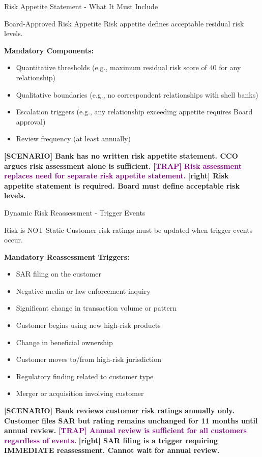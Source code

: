 \documentclass[11pt,a4paper]{beamer}
\newcommand{\trap}[1]{\textcolor{purple}{\textbf{[TRAP] #1}}}
\newcommand{\correct}[1]{\textcolor{green!50!black}{\textbf{[right] #1}}}
\newcommand{\scenario}[1]{\textcolor{blue!70!black}{\textbf{[SCENARIO] #1}}}
\begin{document}
\begin{frame}{Risk Appetite Statement - What It Must Include}
\begin{block}{Board-Approved Risk Appetite}
Risk appetite defines acceptable residual risk levels.
\end{block}
\textbf{Mandatory Components:}
\begin{itemize}
\item Quantitative thresholds (e.g., maximum residual risk score of 40 for any relationship)
\item Qualitative boundaries (e.g., no correspondent relationships with shell banks)
\item Escalation triggers (e.g., any relationship exceeding appetite requires Board approval)
\item Review frequency (at least annually)
\end{itemize}
\scenario{Bank has no written risk appetite statement. CCO argues risk assessment alone is sufficient.}
\trap{Risk assessment replaces need for separate risk appetite statement.}
\correct{Risk appetite statement is required. Board must define acceptable risk levels.}
\end{frame}

\begin{frame}{Dynamic Risk Reassessment - Trigger Events}
\begin{block}{Risk is NOT Static}
Customer risk ratings must be updated when trigger events occur.
\end{block}
\textbf{Mandatory Reassessment Triggers:}
\begin{itemize}
\item SAR filing on the customer
\item Negative media or law enforcement inquiry
\item Significant change in transaction volume or pattern
\item Customer begins using new high-risk products
\item Change in beneficial ownership
\item Customer moves to/from high-risk jurisdiction
\item Regulatory finding related to customer type
\item Merger or acquisition involving customer
\end{itemize}
\scenario{Bank reviews customer risk ratings annually only. Customer files SAR but rating remains unchanged for 11 months until annual review.}
\trap{Annual review is sufficient for all customers regardless of events.}
\correct{SAR filing is a trigger requiring IMMEDIATE reassessment. Cannot wait for annual review.}
\end{frame}
\end{document}
